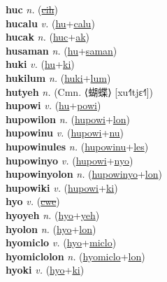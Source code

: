 \textbf{huc} \textit{n.} (\hyperref[cih]{\sout{cih}})
 \label{huc} \\
\textbf{hucalu} \textit{v.} (\hyperref[hu]{hu}+\hyperref[calu]{calu})
 \label{hucalu} \\
\textbf{hucak} \textit{n.} (\hyperref[huc]{huc}+\hyperref[ak]{ak})
 \label{hucak} \\
\textbf{husaman} \textit{n.} (\hyperref[hu]{hu}+\hyperref[saman]{saman})
 \label{husaman} \\
\textbf{huki} \textit{v.} (\hyperref[hu]{hu}+\hyperref[ki]{ki})
 \label{huki} \\
\textbf{hukilum} \textit{n.} (\hyperref[huki]{huki}+\hyperref[lum]{lum})
 \label{hukilum} \\
\textbf{hutyeh} \textit{n.} (Cmn. ⟨蝴蝶⟩ [xu˧˥tjɛ˧˥])
 \label{hutyeh} \\
\textbf{hupowi} \textit{v.} (\hyperref[hu]{hu}+\hyperref[powi]{powi})
 \label{hupowi} \\
\textbf{hupowilon} \textit{n.} (\hyperref[hupowi]{hupowi}+\hyperref[lon]{lon})
 \label{hupowilon} \\
\textbf{hupowinu} \textit{v.} (\hyperref[hupowi]{hupowi}+\hyperref[nu]{nu})
 \label{hupowinu} \\
\textbf{hupowinules} \textit{n.} (\hyperref[hupowinu]{hupowinu}+\hyperref[les]{les})
 \label{hupowinules} \\
\textbf{hupowinyo} \textit{v.} (\hyperref[hupowi]{hupowi}+\hyperref[nyo]{nyo})
 \label{hupowinyo} \\
\textbf{hupowinyolon} \textit{n.} (\hyperref[hupowinyo]{hupowinyo}+\hyperref[lon]{lon})
 \label{hupowinyolon} \\
\textbf{hupowiki} \textit{v.} (\hyperref[hupowi]{hupowi}+\hyperref[ki]{ki})
 \label{hupowiki} \\
\textbf{hyo} \textit{v.} (\hyperref[cwe]{\sout{cwe}})
 \label{hyo} \\
\textbf{hyoyeh} \textit{n.} (\hyperref[hyo]{hyo}+\hyperref[yeh]{yeh})
 \label{hyoyeh} \\
\textbf{hyolon} \textit{n.} (\hyperref[hyo]{hyo}+\hyperref[lon]{lon})
 \label{hyolon} \\
\textbf{hyomiclo} \textit{v.} (\hyperref[hyo]{hyo}+\hyperref[miclo]{miclo})
 \label{hyomiclo} \\
\textbf{hyomiclolon} \textit{n.} (\hyperref[hyomiclo]{hyomiclo}+\hyperref[lon]{lon})
 \label{hyomiclolon} \\
\textbf{hyoki} \textit{v.} (\hyperref[hyo]{hyo}+\hyperref[ki]{ki})
 \label{hyoki} \\

